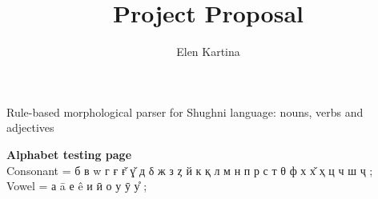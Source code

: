 \newcommand*{\rootdir}{./project_proposal}%



\title{\textbf{Project Proposal}}
\author{Elen Kartina}
\date{}


    \maketitle
    \thispagestyle{empty}
    \vspace{6cm}
    \begin{center}
        \LARGE Rule-based morphological parser for Shughni language: nouns, verbs and adjectives
    \end{center}
    \newpage

    \setcounter{page}{1}
    \tableofcontents
    \newpage

    {\bf Alphabet testing page}\\
    Consonant = б в w г ғ \v{ғ} \v{ɣ} д δ ж з ȥ й к қ л м н п р с т θ ф х \v{х} ҳ ц ч ш ҷ ;\\
    Vowel =     а ā е ê и ӣ о у ӯ \r{у} ;

    
    
    
    
    
    
    
    

